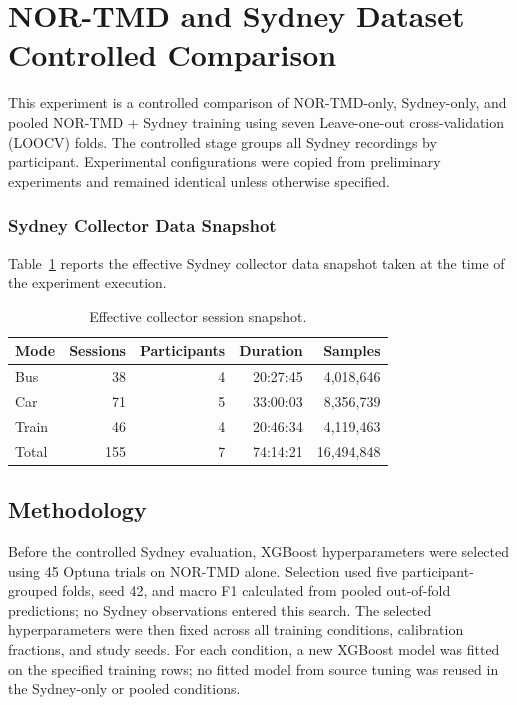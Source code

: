 \section{NOR-TMD and Sydney Dataset Controlled Comparison}

This experiment is a controlled comparison of NOR-TMD-only, Sydney-only, and pooled NOR-TMD + Sydney training using seven Leave-one-out cross-validation (LOOCV) folds. The controlled stage groups all Sydney recordings by participant. Experimental configurations were copied from preliminary experiments and remained identical unless otherwise specified.

\subsubsection{Sydney Collector Data Snapshot}

Table~\ref{tab:nor-sydney-comparison-snapshot} reports the effective Sydney collector data snapshot taken at the time of the experiment execution.

\begin{table}[htbp]
\centering
\caption{Effective collector session snapshot.}
\label{tab:nor-sydney-comparison-snapshot}
\begin{tabular}{lrrrr}
\hline
\textbf{Mode} & \textbf{Sessions} & \textbf{Participants} & \textbf{Duration} & \textbf{Samples} \\
\hline
Bus & 38 & 4 & 20:27:45 & 4,018,646 \\
Car & 71 & 5 & 33:00:03 & 8,356,739 \\
Train & 46 & 4 & 20:46:34 & 4,119,463 \\
Total & 155 & 7 & 74:14:21 & 16,494,848 \\
\hline
\end{tabular}
\end{table}

\subsection{Methodology}

Before the controlled Sydney evaluation, XGBoost hyperparameters were selected using 45 Optuna trials on NOR-TMD alone. Selection used five participant-grouped folds, seed 42, and macro F1 calculated from pooled out-of-fold predictions; no Sydney observations entered this search. The selected hyperparameters were then fixed across all training conditions, calibration fractions, and study seeds. For each condition, a new XGBoost model was fitted on the specified training rows; no fitted model from source tuning was reused in the Sydney-only or pooled conditions.

